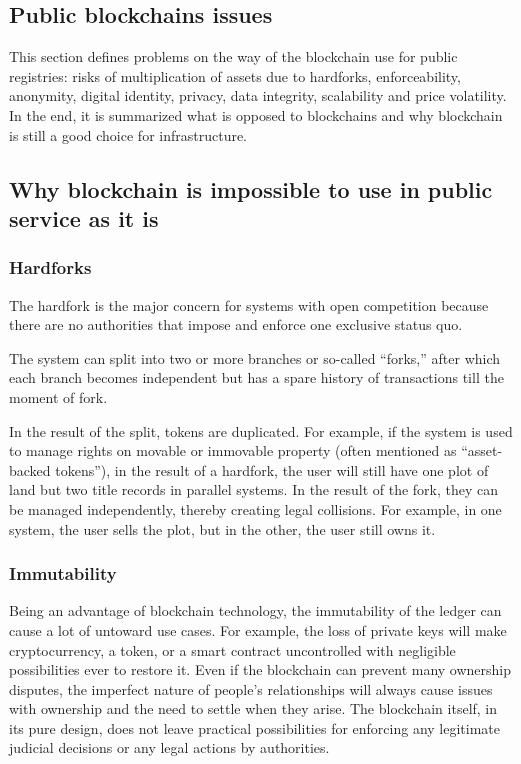 \begin{multicols}{2}
\section{Public blockchains issues}

This section defines problems on the way of the blockchain use for public registries: risks of multiplication of assets due to hardforks, enforceability, anonymity, digital identity, privacy, data integrity, scalability and price volatility. In the end, it is summarized what is opposed to blockchains and why blockchain is still a good choice for infrastructure.

\subsection{Why blockchain is impossible to use in public service as it is}

\subsubsection{Hardforks}

The hardfork is the major concern for systems with open competition because there are no authorities that impose and enforce one exclusive status quo. 

The system can split into two or more branches or so-called “forks,” after which each branch becomes independent but has a spare history of transactions till the moment of fork.

In the result of the split, tokens are duplicated. For example, if the system is used to manage rights on movable or immovable property (often mentioned as “asset-backed tokens”), in the result of a hardfork, the user will still have one plot of land but two title records in parallel systems. In the result of the fork, they can be managed independently, thereby creating legal collisions. For example, in one system, the user sells the plot, but in the other, the user still owns it.

\subsubsection{Immutability}

Being an advantage of blockchain technology, the immutability of the ledger can cause a lot of untoward use cases. For example, the loss of private keys will make cryptocurrency, a token, or a smart contract uncontrolled with negligible possibilities ever to restore it. Even if the blockchain can prevent many ownership disputes, the imperfect nature of people’s relationships will always cause issues with ownership and the need to settle when they arise. The blockchain itself, in its pure design, does not leave practical possibilities for enforcing any legitimate judicial decisions or any legal actions by authorities.


\end{multicols}
